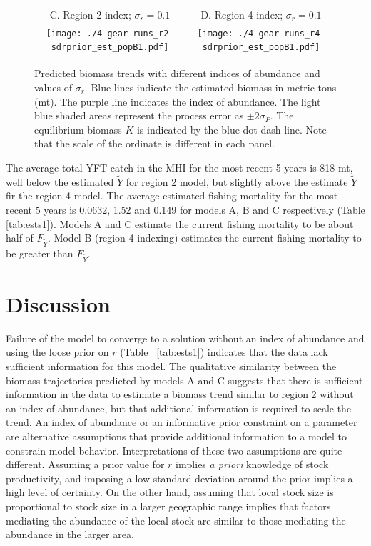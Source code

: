 \documentclass[12pt,letterpaper]{article}
\newcommand\MSY{\widetilde{Y}}
\newcommand\Fmsy{F_{\MSY}}
\begin{document}
\begin{figure}
\begin{center}
{\begin{tabular}{cc}
C. Region 2 index; $\sigma_r=0.1$ &
D. Region 4 index; $\sigma_r=0.1$ \\
\texttt{[image: ./4-gear-runs\_r2-sdrprior\_est\_popB1.pdf]} &
\texttt{[image: ./4-gear-runs\_r4-sdrprior\_est\_popB1.pdf]} \\
\end{tabular}
}
\caption{Predicted biomass trends with different indices of abundance
and values of $\sigma_r$.
Blue lines indicate the estimated biomass in metric tons (mt).
The purple line indicates the index of abundance.
The light blue shaded areas represent the process error as 
$\pm 2\sigma_P$.
The equilibrium biomass $K$ is indicated by the blue dot-dash line.
Note that the scale of the ordinate is different in each panel.
\label{fig:estbiomass}}
\end{center}
\end{figure}

The average total YFT catch in the MHI for the most recent 5 years
is 818 mt, well below the estimated $\MSY$ for region 2 model, but
slightly above the estimate $\MSY$ fir the region 4 model.
The average estimated fishing mortality for the most recent 5 years 
is 0.0632, 1.52 and 0.149 for models A, B and C respectively
(Table \ref{tab:ests1}).
Models A and C estimate the current fishing mortality to be about half
of $\Fmsy$.  Model B (region 4 indexing) estimates the current fishing
mortality to be greater than $\Fmsy$.

\section*{Discussion}
Failure of the model to converge to a solution without an index of
abundance and using the loose prior on $r$ (Table~ \ref{tab:ests1})
indicates that the data lack sufficient information for this model.
The qualitative similarity between the biomass trajectories predicted
by models A and C suggests that
there is sufficient information in the
data to estimate a biomass trend similar to region 2 without
an index of abundance, but that additional information is
required to scale the trend.
An index of abundance or an informative prior
constraint on a parameter are
alternative assumptions that provide additional information to a model
to constrain model behavior.
Interpretations of these two assumptions are quite different. 
Assuming a prior value for $r$ implies {\it a priori} knowledge of stock
productivity, and imposing a low standard deviation around the
prior implies a high level of certainty. On the other hand,
assuming that local stock size is proportional to stock size in
a larger geographic range
implies that factors mediating the abundance
of the local stock are similar to those mediating the
abundance in the larger area.
\end{document}
